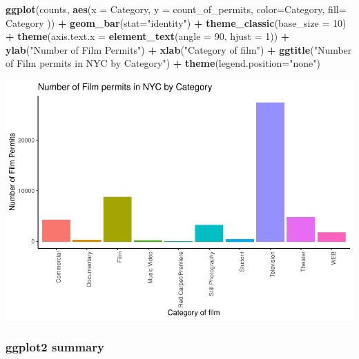 \documentclass[]{book}
\newenvironment{Shaded}{\begin{snugshade}}{\end{snugshade}}
\newcommand{\KeywordTok}[1]{\textcolor[rgb]{0.13,0.29,0.53}{\textbf{#1}}}
\newcommand{\DataTypeTok}[1]{\textcolor[rgb]{0.13,0.29,0.53}{#1}}
\newcommand{\DecValTok}[1]{\textcolor[rgb]{0.00,0.00,0.81}{#1}}
\newcommand{\StringTok}[1]{\textcolor[rgb]{0.31,0.60,0.02}{#1}}
\newcommand{\OperatorTok}[1]{\textcolor[rgb]{0.81,0.36,0.00}{\textbf{#1}}}
\newcommand{\NormalTok}[1]{#1}
\begin{document}
\begin{Shaded}
\begin{Highlighting}[]
\KeywordTok{ggplot}\NormalTok{(counts, }\KeywordTok{aes}\NormalTok{(}\DataTypeTok{x =}\NormalTok{ Category, }\DataTypeTok{y =}\NormalTok{ count_of_permits, }
                   \DataTypeTok{color=}\NormalTok{Category, }
                   \DataTypeTok{fill=}\NormalTok{ Category )) }\OperatorTok{+}
\StringTok{  }\KeywordTok{geom_bar}\NormalTok{(}\DataTypeTok{stat=}\StringTok{"identity"}\NormalTok{) }\OperatorTok{+}\StringTok{ }
\StringTok{  }\KeywordTok{theme_classic}\NormalTok{(}\DataTypeTok{base_size =} \DecValTok{10}\NormalTok{) }\OperatorTok{+}
\StringTok{  }\KeywordTok{theme}\NormalTok{(}\DataTypeTok{axis.text.x =} \KeywordTok{element_text}\NormalTok{(}\DataTypeTok{angle =} \DecValTok{90}\NormalTok{, }\DataTypeTok{hjust =} \DecValTok{1}\NormalTok{)) }\OperatorTok{+}
\StringTok{  }\KeywordTok{ylab}\NormalTok{(}\StringTok{"Number of Film Permits"}\NormalTok{) }\OperatorTok{+}\StringTok{ }
\StringTok{  }\KeywordTok{xlab}\NormalTok{(}\StringTok{"Category of film"}\NormalTok{) }\OperatorTok{+}
\StringTok{  }\KeywordTok{ggtitle}\NormalTok{(}\StringTok{"Number of Film permits in NYC by Category"}\NormalTok{) }\OperatorTok{+}
\StringTok{  }\KeywordTok{theme}\NormalTok{(}\DataTypeTok{legend.position=}\StringTok{"none"}\NormalTok{) }
\end{Highlighting}
\end{Shaded}

\includegraphics{Statistics_Lab_files/figure-latex/1categoryL-1.pdf}

\subsubsection{ggplot2 summary}\label{ggplot2-summary}
\end{document}
